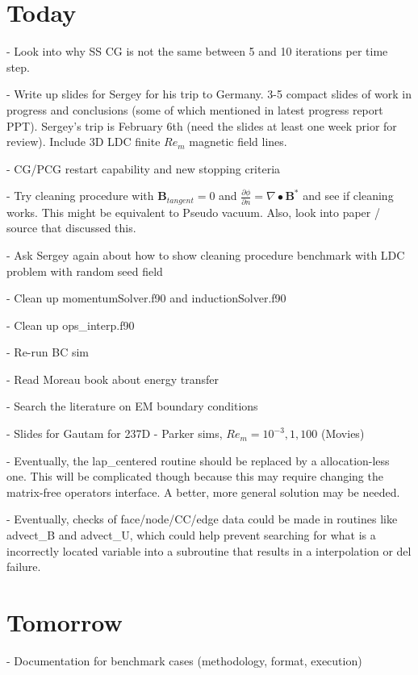 \documentclass[3p,twocolumn,10pt]{elsarticle}
\begin{document}
\section{Today}

- Look into why SS CG is not the same between 5 and 10 iterations per time step.

- Write up slides for Sergey for his trip to Germany. 3-5 compact slides of work in progress and conclusions (some of which mentioned in latest progress report PPT). Sergey's trip is February 6th (need the slides at least one week prior for review). Include 3D LDC finite $Re_m$ magnetic field lines.

- CG/PCG restart capability and new stopping criteria

- Try cleaning procedure with $\mathbf{B}_{tangent}=0$ and $\frac{\partial \phi}{\partial n} = \nabla \bullet \mathbf{B}^*$ and see if cleaning works. This might be equivalent to Pseudo vacuum. Also, look into paper / source that discussed this.

- Ask Sergey again about how to show cleaning procedure benchmark with LDC problem with random seed field

- Clean up momentumSolver.f90 and inductionSolver.f90

- Clean up ops\_interp.f90

- Re-run BC sim

- Read Moreau book about energy transfer

- Search the literature on EM boundary conditions

- Slides for Gautam for 237D - Parker sims, $Re_m=10^{-3}, 1, 100$ (Movies)

- Eventually, the lap\_centered routine should be replaced by a allocation-less one. This will be complicated though because this may require changing the matrix-free operators interface. A better, more general solution may be needed.

- Eventually, checks of face/node/CC/edge data could be made in routines like advect\_B and advect\_U, which could help prevent searching for what is a incorrectly located variable into a subroutine that results in a interpolation or del failure.

\section{Tomorrow}

- Documentation for benchmark cases (methodology, format, execution)
\end{document}

